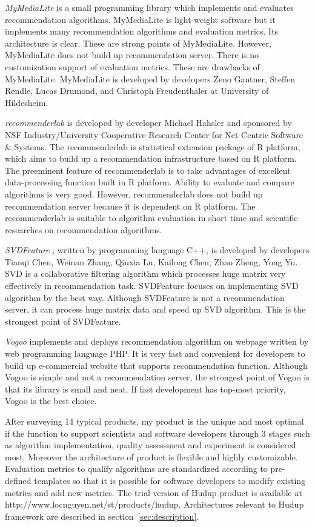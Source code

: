 \documentclass[a4paper]{llncs}
\begin{document}
\textit{MyMediaLite} \cite{mymedialite} is a small programming library which implements and evaluates recommendation algorithms. MyMediaLite is light-weight software but it implements many recommendation algorithms and evaluation metrics. Its architecture is clear. These are strong points of MyMediaLite. However, MyMediaLite does not build up recommendation server. There is no customization support of evaluation metrics. These are drawbacks of MyMediaLite. MyMediaLite is developed by developers Zeno Gantner, Steffen Rendle, Lucas Drumond, and Christoph Freudenthaler at University of Hildesheim.

\textit{recommenderlab} \cite{recommenderlab} is developed by developer Michael Hahsler and sponsored by NSF Industry/University Cooperative Research Center for Net-Centric Software \& Systems. The recommenderlab is statistical extension package of R platform, which aims to build up a recommendation infrastructure based on R platform. The preeminent feature of recommenderlab is to take advantages of excellent data-processing function built in R platform. Ability to evaluate and compare algorithms is very good. However, recommenderlab does not build up recommendation server because it is dependent on R platform. The recommenderlab is suitable to algorithm evaluation in short time and scientific researches on recommendation algorithms.

\textit{SVDFeature} \cite{svdfeature}, written by programming language C++, is developed by developers Tianqi Chen, Weinan Zhang, Qiuxia Lu, Kailong Chen, Zhao Zheng, Yong Yu. SVD is a collaborative filtering algorithm which processes huge matrix very effectively in recommendation task. SVDFeature focuses on implementing SVD algorithm by the best way. Although SVDFeature is not a recommendation server, it can process huge matrix data and speed up SVD algorithm. This is the strongest point of SVDFeature.

\textit{Vogoo} \cite{vogoo} implements and deploys recommendation algorithm on webpage written by web programming language PHP. It is very fast and convenient for developers to build up e-commercial website that supports recommendation function. Although Vogoo is simple and not a recommendation server, the strongest point of Vogoo is that its library is small and neat. If fast development has top-most priority, Vogoo is the best choice.

After surveying 14 typical products, my product is the unique and most optimal if the function to support scientists and software developers through 3 stages such as algorithm implementation, quality assessment and experiment is considered most. Moreover the architecture of product is flexible and highly customizable. Evaluation metrics to qualify algorithms are standardized according to pre-defined templates so that it is possible for software developers to modify existing metrics and add new metrics. The trial version of Hudup product is available at http://www.locnguyen.net/st/products/hudup. Architectures relevant to Hudup framework are described in section~\ref{sec:description}.
\end{document}

